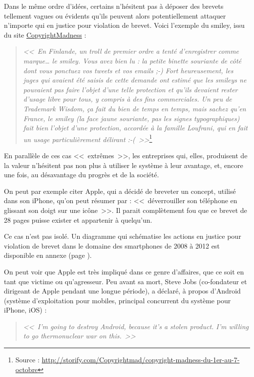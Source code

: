 Dans le même ordre d'idées, certains n'hésitent pas à déposer des brevets tellement vagues ou évidents qu'ils peuvent alors potentiellement attaquer n'importe qui en justice pour violation de brevet.
Voici l'exemple du smiley, issu du site \href{http://copyrightmadness.tumblr.com/}{CopyrightMadness} :

\begin{quotation}
\textit{<<~En Finlande, un troll de premier ordre a tenté d'enregistrer comme marque\dots{} le smiley.
Vous avez bien lu : la petite binette souriante de côté dont vous ponctuez vos tweets et vos emails ;-)
Fort heureusement, les juges qui avaient été saisis de cette demande ont estimé que les smileys ne pouvaient pas faire l'objet d'une telle protection et qu'ils devaient rester d'usage libre pour tous, y compris à des fins commerciales.
Un peu de Trademark Wisdom, ça fait du bien de temps en temps, mais sachez qu'en France, le smiley (la face jaune souriante, pas les signes typographiques) fait bien l'objet d'une protection, accordée à la famille Loufrani, qui en fait un usage particulièrement délirant :-(~>>}\footnote{Source : \url{http://storify.com/Copyrightmad/copyright-madness-du-1er-au-7-octobre}}
\end{quotation}

En parallèle de ces cas <<~extrêmes~>>, les entreprises qui, elles, produisent de la valeur n'hésitent pas non plus à utiliser le système à leur avantage, et, encore une fois, au désavantage du progrès et de la société.

On peut par exemple citer Apple, qui a décidé de breveter un concept, utilisé dans son iPhone, qu'on peut résumer par : <<~déverrouiller son téléphone en glissant son doigt sur une icône~>>.
Il parait complètement fou que ce brevet de 28 pages puisse exister et appartenir à quelqu'un.

Ce cas n'est pas isolé.
Un diagramme qui schématise les actions en justice pour violation de brevet dans le domaine des smartphones de 2008 à 2012 est disponible en annexe (page \pageref{annexe-smartphones}).

On peut voir que Apple est très impliqué dans ce genre d'affaires, que ce soit en tant que victime ou qu'agresseur.
Peu avant sa mort, Steve Jobs (co-fondateur et dirigeant de Apple pendant une longue période), a déclaré, à propos d'Android (système d'exploitation pour mobiles, principal concurrent du système pour iPhone, iOS) :

\begin{quote}
\textit{{\Large <<~I'm going to destroy Android, because it's a stolen product.
I'm willing to go thermonuclear war on this.~>>}}
\end{quote}

